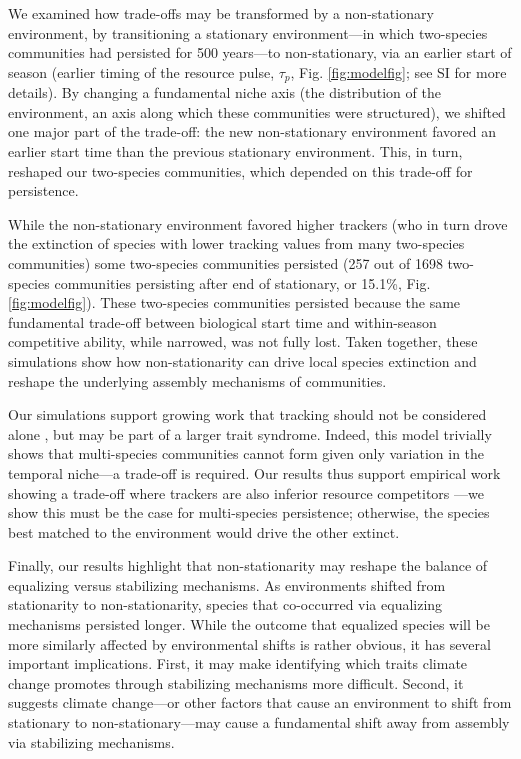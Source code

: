 \documentclass[11pt,letterpaper]{article}
\begin{document}
We examined how trade-offs may be transformed by a non-stationary environment, by transitioning a stationary environment---in which two-species communities had persisted for 500 years---to non-stationary, via an earlier start of season (earlier timing of the resource pulse, $\tau_p$, Fig. \ref{fig:modelfig}; see SI for more details). By changing a fundamental niche axis (the distribution of the environment, an axis along which these communities were structured), we shifted one major part of the trade-off: the new non-stationary environment favored an earlier start time than the previous stationary environment. This, in turn, reshaped our two-species communities, which depended on this trade-off for persistence. 

While the non-stationary environment favored higher trackers (who in turn drove the extinction of species with lower tracking values from many two-species communities) some two-species communities persisted (257 out of 1698 two-species communities persisting after end of stationary, or 15.1\%, Fig. \ref{fig:modelfig}). These two-species communities persisted because the same fundamental trade-off between biological start time and within-season competitive ability, while narrowed, was not fully lost. Taken together, these simulations show how non-stationarity can drive local species extinction and reshape the underlying assembly mechanisms of communities.

Our simulations support growing work that tracking should not be considered alone \citep{Diamond:2011nx,Dorji2013,Ishioka2013,kharouba2014,du2017}, but may be part of a larger trait syndrome. Indeed, this model trivially shows that multi-species communities cannot form given only variation in the temporal niche---a trade-off is required. Our results thus support empirical work showing a trade-off where trackers are also inferior resource competitors \citep{lasky2016,Zhu2016BioLetters}---we show this must be the case for multi-species persistence; otherwise, the species best matched to the environment would drive the other extinct.

Finally, our results highlight that non-stationarity may reshape the balance of equalizing versus stabilizing mechanisms. As environments shifted from stationarity to non-stationarity, species that co-occurred via equalizing mechanisms persisted longer. While the outcome that equalized species will be more similarly affected by environmental shifts is rather obvious, it has several important implications. First, it may make identifying which traits climate change promotes through stabilizing mechanisms more difficult. Second, it suggests climate change---or other factors that cause an environment to shift from stationary to non-stationary---may cause a fundamental shift away from assembly via stabilizing mechanisms. %
\end{document}

